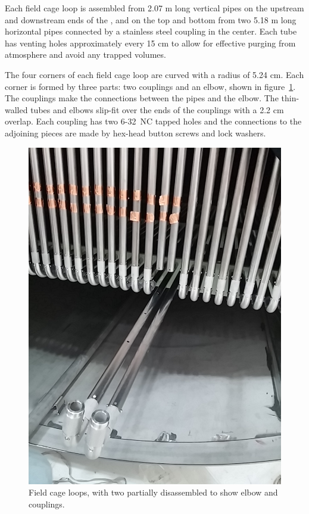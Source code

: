 Each field cage loop is assembled from 2.07 m long vertical pipes on the upstream and downstream ends of the \lartpc, and on the top and bottom from two 5.18 m long horizontal pipes connected by a stainless steel coupling in the center.  Each tube has venting holes approximately every 15 cm to allow for effective purging from atmosphere and avoid any trapped volumes.  

The four corners of each field cage loop are curved with a radius of 5.24 cm. Each corner is formed by three parts: two couplings and an elbow, shown in figure~\ref{fig:tpc-fieldcage-elbows}. The couplings make the connections between the pipes and the elbow. The thin-walled tubes and elbows slip-fit over the ends of the couplings with a 2.2 cm overlap. Each coupling has two 6-32~NC tapped holes and the connections to the adjoining pieces are made by hex-head button screws and lock washers.

\begin{figure}
\centering	
\includegraphics[width=0.8\linewidth]{figures/tpc-fieldcage-elbows.jpg}
\caption{Field cage loops, with two partially disassembled to show elbow and couplings.}
\label{fig:tpc-fieldcage-elbows}
\end{figure}

